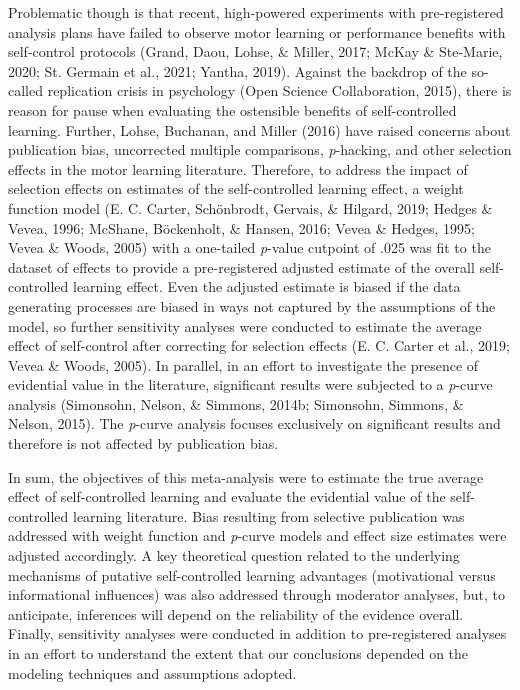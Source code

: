 \documentclass[
  english,
  man, donotrepeattitle,floatsintext]{apa7}
\begin{document}
Problematic though is that recent, high-powered experiments with pre-registered analysis plans have failed to observe motor learning or performance benefits with self-control protocols (Grand, Daou, Lohse, \& Miller, 2017; McKay \& Ste-Marie, 2020; St. Germain et al., 2021; Yantha, 2019). Against the backdrop of the so-called replication crisis in psychology (Open Science Collaboration, 2015), there is reason for pause when evaluating the ostensible benefits of self-controlled learning. Further, Lohse, Buchanan, and Miller (2016) have raised concerns about publication bias, uncorrected multiple comparisons, \emph{p}-hacking, and other selection effects in the motor learning literature. Therefore, to address the impact of selection effects on estimates of the self-controlled learning effect, a weight function model (E. C. Carter, Schönbrodt, Gervais, \& Hilgard, 2019; Hedges \& Vevea, 1996; McShane, Böckenholt, \& Hansen, 2016; Vevea \& Hedges, 1995; Vevea \& Woods, 2005) with a one-tailed \emph{p}-value cutpoint of .025 was fit to the dataset of effects to provide a pre-registered adjusted estimate of the overall self-controlled learning effect. Even the adjusted estimate is biased if the data generating processes are biased in ways not captured by the assumptions of the model, so further sensitivity analyses were conducted to estimate the average effect of self-control after correcting for selection effects (E. C. Carter et al., 2019; Vevea \& Woods, 2005). In parallel, in an effort to investigate the presence of evidential value in the literature, significant results were subjected to a \emph{p}-curve analysis (Simonsohn, Nelson, \& Simmons, 2014b; Simonsohn, Simmons, \& Nelson, 2015). The \emph{p}-curve analysis focuses exclusively on significant results and therefore is not affected by publication bias.

In sum, the objectives of this meta-analysis were to estimate the true average effect of self-controlled learning and evaluate the evidential value of the self-controlled learning literature. Bias resulting from selective publication was addressed with weight function and \emph{p}-curve models and effect size estimates were adjusted accordingly. A key theoretical question related to the underlying mechanisms of putative self-controlled learning advantages (motivational versus informational influences) was also addressed through moderator analyses, but, to anticipate, inferences will depend on the reliability of the evidence overall. Finally, sensitivity analyses were conducted in addition to pre-registered analyses in an effort to understand the extent that our conclusions depended on the modeling techniques and assumptions adopted.
\end{document}
